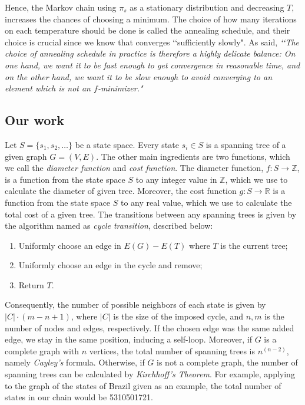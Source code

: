 \documentclass[12pt]{article}
\begin{document}
Hence, the Markov chain using $\pi_s$ as a stationary distribution and decreasing $T$,  increases the chances of choosing a minimum. The choice of how many iterations on each temperature should be done is called the annealing schedule, and their choice is crucial since we know that converges ‘‘sufficiently slowly". As \cite{Olle2002} said, \emph{‘‘The choice of annealing schedule in practice is therefore a highly delicate balance: On one hand, we want it to be fast enough to get convergence in reasonable time, and on the other hand, we want it to be slow enough to avoid converging to an element which is not an $f$-minimizer."}


\subsection{Our work}

Let $S = \{s_1,s_2, \dots\}$ be a state space. Every state $s_i \in S$ is a spanning tree of a given graph $G = (V,E)$. The other main ingredients are two functions, which we call the \emph{diameter function} and \emph{cost function}. The diameter function, $f: S \rightarrow \mathds{Z}$, is a function from the state space $S$ to any integer value in $\mathds{Z}$, which we use to calculate the diameter of given tree. Moreover, the cost function $g: S \rightarrow \mathds{R}$ is a function from the state space $S$ to any real value, which we use to calculate the total cost of a given tree. The transitions between any spanning trees is given by the algorithm named as \emph{cycle transition}, described below:
\vspace{0.3cm}
\begin{enumerate}
    \item Uniformly choose an edge in $E(G) - E(T)$ where $T$ is the current tree;
    \item Uniformly choose an edge in the cycle and remove;
    \item Return $T$.
\end{enumerate}
\vspace{0.3cm}

Consequently, the number of possible neighbors of each state is given by $|C|\cdot(m-n+1)$, where $|C|$ is the size of the imposed cycle, and $n,m$ is the number of nodes and edges, respectively. If the chosen edge was the same added edge, we stay in the same position, inducing a self-loop. Moreover, if $G$ is a complete graph with $n$ vertices, the total number of spanning trees is $n^{(n-2)}$, namely \emph{Cayley's} formula. Otherwise, if $G$ is not a complete graph, the number of spanning trees can be calculated by \emph{ Kirchhoff's Theorem}. For example, applying to the graph of the states of Brazil given as an example, the total number of states in our chain would be 5310501721.   
\end{document}
